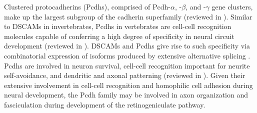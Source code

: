 Clustered protocadherins (Pcdhs), comprised of Pcdh-$\alpha$, -$\beta$, and -$\gamma$ gene clusters, make up the largest subgroup of the cadherin superfamily (reviewed in ).
Similar to DSCAMs in invertebrates, Pcdhs in vertebrates are cell-cell recognition molecules capable of conferring a high degree of specificity in neural circuit development (reviewed in ).
DSCAMs and Pcdhs give rise to such specificity via combinatorial expression of isoforms produced by extensive alternative splicing \cite{zipursky2010chemoaffinity}.
Pcdhs are involved in neuron survival, cell-cell recognition important for neurite self-avoidance, and dendritic and axonal patterning (reviewed in ).
Given their extensive involvement in cell-cell recognition and homophilic cell adhesion during neural development, the Pcdh family may be involved in axon organization and fasciculation during development of the retinogeniculate pathway.
